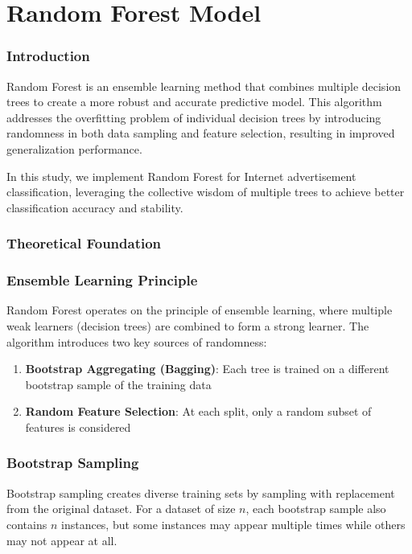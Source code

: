 \section{Random Forest Model}

\subsubsection{Introduction}

Random Forest is an ensemble learning method that combines multiple decision trees to create a more robust and accurate predictive model. This algorithm addresses the overfitting problem of individual decision trees by introducing randomness in both data sampling and feature selection, resulting in improved generalization performance.

In this study, we implement Random Forest for Internet advertisement classification, leveraging the collective wisdom of multiple trees to achieve better classification accuracy and stability.

\subsubsection{Theoretical Foundation}

\subsubsection{Ensemble Learning Principle}

Random Forest operates on the principle of ensemble learning, where multiple weak learners (decision trees) are combined to form a strong learner. The algorithm introduces two key sources of randomness:

\begin{enumerate}
    \item \textbf{Bootstrap Aggregating (Bagging)}: Each tree is trained on a different bootstrap sample of the training data
    \item \textbf{Random Feature Selection}: At each split, only a random subset of features is considered
\end{enumerate}

\subsubsection{Bootstrap Sampling}

Bootstrap sampling creates diverse training sets by sampling with replacement from the original dataset. For a dataset of size $n$, each bootstrap sample also contains $n$ instances, but some instances may appear multiple times while others may not appear at all.

